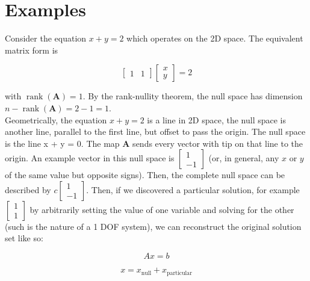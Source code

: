 \documentclass[11pt,a4paper]{article}
\begin{document}
\section{Examples}

Consider the equation \(x + y = 2\) which operates on the 2D space. The equivalent matrix form is

\begin{equation}
    \begin{bmatrix}
        1 & 1
    \end{bmatrix}
    \begin{bmatrix}
        x \\
        y
    \end{bmatrix}
    = 2
\end{equation}

with \(\operatorname{rank}(\mathbf{A}) = 1\). By the rank-nullity theorem, the null space has dimension \(n - \operatorname{rank}(\mathbf{A}) = 2 - 1 = 1\). \\

Geometrically, the equation \(x + y = 2\) is a line in 2D space, the null space is another line, parallel to the first line, but offset to pass the origin. The null space is the line x + y = 0. The map \(\mathbf{A}\) sends every vector with tip on that line to the origin. An example vector in this null space is \(\begin{bmatrix}1 \\ -1\end{bmatrix}\) (or, in general, any \(x\) or \(y\) of the same value but opposite signs). Then, the complete null space can be described by \(c \begin{bmatrix}1 \\ -1\end{bmatrix}\). Then, if we discovered a particular solution, for example \(\begin{bmatrix}1 \\ 1\end{bmatrix}\) by arbitrarily setting the value of one variable and solving for the other (such is the nature of a 1 DOF system), we can reconstruct the original solution set like so:

\begin{equation}
    Ax = b
\end{equation}

\begin{equation}
    x = x_\text{null} + x_\text{particular}
\end{equation}
\end{document}
